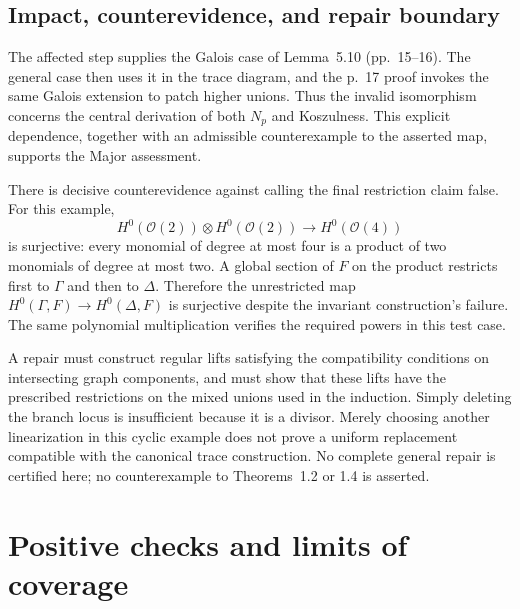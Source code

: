 \documentclass[10pt]{article}
\begin{document}
\subsection*{Impact, counterevidence, and repair boundary}
The affected step supplies the Galois case of Lemma 5.10 (pp. 15–16). The general case then uses it in the trace diagram, and the p. 17 proof invokes the same Galois extension to patch higher unions. Thus the invalid isomorphism concerns the central derivation of both \(N_p\) and Koszulness. This explicit dependence, together with an admissible counterexample to the asserted map, supports the Major assessment.\par
There is decisive counterevidence against calling the final restriction claim false. For this example, \[H^0(\mathcal O(2))\otimes H^0(\mathcal O(2))\longrightarrow H^0(\mathcal O(4))\] is surjective: every monomial of degree at most four is a product of two monomials of degree at most two. A global section of \(F\) on the product restricts first to \(\Gamma\) and then to \(\Delta\). Therefore the unrestricted map \(H^0(\Gamma,F)\to H^0(\Delta,F)\) is surjective despite the invariant construction’s failure. The same polynomial multiplication verifies the required powers in this test case.\par
A repair must construct regular lifts satisfying the compatibility conditions on intersecting graph components, and must show that these lifts have the prescribed restrictions on the mixed unions used in the induction. Simply deleting the branch locus is insufficient because it is a divisor. Merely choosing another linearization in this cyclic example does not prove a uniform replacement compatible with the canonical trace construction. No complete general repair is certified here; no counterexample to Theorems 1.2 or 1.4 is asserted.\par
\section*{Positive checks and limits of coverage}
\end{document}
